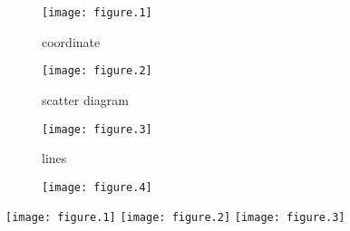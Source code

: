 \documentclass[12pt]{article}
\begin{document}
\begin{figure}
    \begin{minipage}[t]{10cm}
      \centering
      \texttt{[image: figure.1]}
      \centerline{coordinate}
    \end{minipage}

    \begin{minipage}[t]{10cm}
      \centering
      \texttt{[image: figure.2]}
      \centerline{scatter diagram}
    \end{minipage}

    \begin{minipage}[t]{10cm}
      \centering
      \texttt{[image: figure.3]}
      \centerline{lines}
    \end{minipage}
    
    \begin{minipage}[t]{10cm}
      \centering
      \texttt{[image: figure.4]}
    \end{minipage}
\end{figure}
\texttt{[image: figure.1]}
\texttt{[image: figure.2]}
\texttt{[image: figure.3]}
\end{document}
